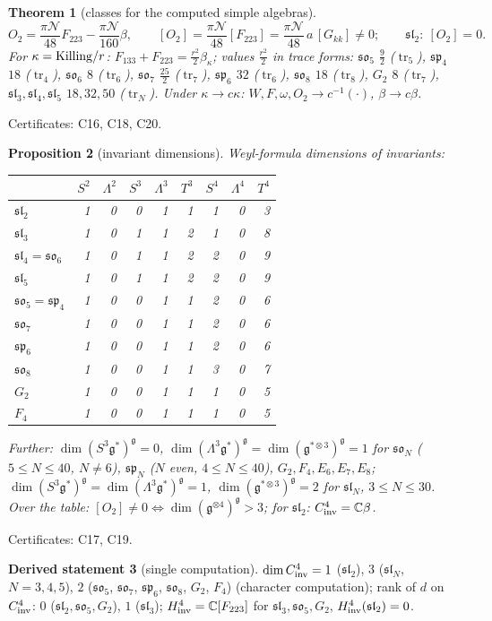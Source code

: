 \documentclass[10pt,a4paper]{article}
\numberwithin{equation}{section}
\newtheorem{theorem}{Theorem}[section]
\newtheorem{proposition}[theorem]{Proposition}
\theoremstyle{definition}
\newtheorem{dstatement}[theorem]{Derived statement}
\theoremstyle{remark}
\newcommand{\tr}{\operatorname{tr}}
\newcommand{\g}{\mathfrak g}
\newcommand{\fsl}{\mathfrak{sl}}
\newcommand{\fso}{\mathfrak{so}}
\newcommand{\fsp}{\mathfrak{sp}}
\newcommand{\cN}{\mathcal N}
\newcommand{\cert}[1]{\par\noindent\textup{Certificates: #1.}\par}
\begin{document}
\begin{theorem}[classes for the computed simple algebras]
\begin{equation}
O_2=\frac{\pi\cN}{48}F_{223}-\frac{\pi\cN}{160}\beta,\qquad [O_2]=\frac{\pi\cN}{48}[F_{223}]=\frac{\pi\cN}{48}\,a\,[G_{kk}]\neq0;\qquad \fsl_2:\ [O_2]=0 .
\end{equation}
For $\kappa={\rm Killing}/r$: $F_{133}+F_{223}=\frac{r^2}2\beta_\kappa$; values $\frac{r^2}{2}$ in trace forms: $\fso_5$ $\frac92$ ($\tr_5$), $\fsp_4$ $18$ ($\tr_4$), $\fso_6$ $8$ ($\tr_6$), $\fso_7$ $\frac{25}2$ ($\tr_7$), $\fsp_6$ $32$ ($\tr_6$), $\fso_8$ $18$ ($\tr_8$), $G_2$ $8$ ($\tr_7$), $\fsl_3,\fsl_4,\fsl_5$ $18,32,50$ ($\tr_N$). Under $\kappa\to c\kappa$: $W,F,\omega,O_2\to c^{-1}(\cdot)$, $\beta\to c\beta$.
\end{theorem}
\cert{C16, C18, C20}

\begin{proposition}[invariant dimensions]\label{prop-inv}
Weyl-formula dimensions of invariants:
{\small
\begin{longtable}{@{}lrrrrrrrr@{}}
\toprule
 & $S^2$ & $\Lambda^2$ & $S^3$ & $\Lambda^3$ & $T^3$ & $S^4$ & $\Lambda^4$ & $T^4$\\
\midrule
$\fsl_2$ & 1&0&0&1&1&1&0&3\\
$\fsl_3$ & 1&0&1&1&2&1&0&8\\
$\fsl_4=\fso_6$ & 1&0&1&1&2&2&0&9\\
$\fsl_5$ & 1&0&1&1&2&2&0&9\\
$\fso_5=\fsp_4$ & 1&0&0&1&1&2&0&6\\
$\fso_7$ & 1&0&0&1&1&2&0&6\\
$\fsp_6$ & 1&0&0&1&1&2&0&6\\
$\fso_8$ & 1&0&0&1&1&3&0&7\\
$G_2$ & 1&0&0&1&1&1&0&5\\
$F_4$ & 1&0&0&1&1&1&0&5\\
\bottomrule
\end{longtable}}
Further: $\dim(S^3\g^*)^\g=0$, $\dim(\Lambda^3\g^*)^\g=\dim(\g^{*\otimes3})^\g=1$ for $\fso_N$ ($5\le N\le40$, $N\ne6$), $\fsp_N$ ($N$ even, $4\le N\le40$), $G_2,F_4,E_6,E_7,E_8$; $\dim(S^3\g^*)^\g=\dim(\Lambda^3\g^*)^\g=1$, $\dim(\g^{*\otimes3})^\g=2$ for $\fsl_N$, $3\le N\le30$. Over the table: $[O_2]\neq0\iff\dim(\g^{\otimes4})^\g>3$; for $\fsl_2$: $C^4_{\rm inv}=\mathbb C\beta$.
\end{proposition}
\cert{C17, C19}

\begin{dstatement}[single computation]\label{ds-C4inv}
$\dim C^4_{\rm inv}=1$ ($\fsl_2$), $3$ ($\fsl_N$, $N=3,4,5$), $2$ ($\fso_5$, $\fso_7$, $\fsp_6$, $\fso_8$, $G_2$, $F_4$) (character computation); rank of $d$ on $C^4_{\rm inv}$: $0$ ($\fsl_2,\fso_5,G_2$), $1$ ($\fsl_3$); $H^4_{\rm inv}=\mathbb C[F_{223}]$ for $\fsl_3,\fso_5,G_2$, $H^4_{\rm inv}(\fsl_2)=0$.
\end{dstatement}
\end{document}
